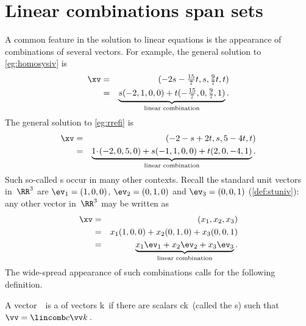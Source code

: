 
\section{Linear combinations span sets}
\label{sec:lcss}
\secttoc

\begin{comment}
\pooliv{\S2.3} \layiv{\S1.3} \holti{\S2.1--2} \nakos{\S2.3}
\end{comment}



A common feature in the solution to linear equations is the  appearance of combinations of several vectors.
For example, the general solution to \autoref{eg:homosysiv}  is 
\begin{eqnarray*}
\xv&=&(-2s-\tfrac{15}7t,s,\tfrac97t,t) 
\\&=&\underbrace{s(-2,1,0,0)+t(-\tfrac{15}7,0,\tfrac97,1)}_{\text{linear combination}}.
\end{eqnarray*}
The general solution to \autoref{eg:rrefi} is
\begin{eqnarray*}
\xv&=&(-2-s+2t,s,5-4t,t)
\\&=&\underbrace{1\cdot(-2,0,5,0)+s(-1,1,0,0)+t(2,0,-4,1)}_{\text{linear combination}}.
\end{eqnarray*}
Such so-called s occur in many other contexts.
Recall the standard unit vectors in~\(\RR^3\) are \(\ev_1=(1,0,0)\), \(\ev_2=(0,1,0)\) and \(\ev_3=(0,0,1)\) (\autoref{def:stuniv}): any other vector in~\(\RR^3\) may be written as
\begin{eqnarray*}
\xv&=&(x_1,x_2,x_3)
\\&=&x_1(1,0,0)+x_2(0,1,0)+x_3(0,0,1)
\\&=&\underbrace{x_1\ev_1+x_2\ev_2+x_3\ev_3}_{\text{linear combination}}.
\end{eqnarray*}
The wide-spread appearance of such combinations calls for the following definition.

\begin{definition} \label{def:lincom}
A vector~\vv\ is a  of vectors \hlist\vv k\ if there are scalars \hlist ck\ (called the s) such that \(\vv=\lincomb c\vv k\)\,.
\end{definition}


